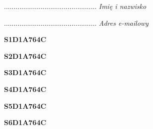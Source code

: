 \begin{turn}{90}\begin{minipage}{\linewidth} \vspace{20mm} ................................................  \textit{Imię i nazwisko}\end{minipage}\end{turn}

\begin{turn}{90}\begin{minipage}{\linewidth} \vspace{20mm} ................................................  \textit{Adres e-mailowy}\end{minipage}\end{turn}

\begin{turn}{90}\huge \begin{minipage}{\linewidth} \vspace{10mm}\textbf{S1D1A764C}\end{minipage}\end{turn}

\begin{turn}{90}\huge \begin{minipage}{\linewidth} \vspace{10mm}\textbf{S2D1A764C}\end{minipage}\end{turn}

\begin{turn}{90}\huge \begin{minipage}{\linewidth} \vspace{10mm}\textbf{S3D1A764C}\end{minipage}\end{turn}

\begin{turn}{90}\huge \begin{minipage}{\linewidth} \vspace{10mm}\textbf{S4D1A764C}\end{minipage}\end{turn}

\begin{turn}{90}\huge \begin{minipage}{\linewidth} \vspace{10mm}\textbf{S5D1A764C}\end{minipage}\end{turn}

\begin{turn}{90}\huge \begin{minipage}{\linewidth} \vspace{10mm}\textbf{S6D1A764C}\end{minipage}\end{turn}

